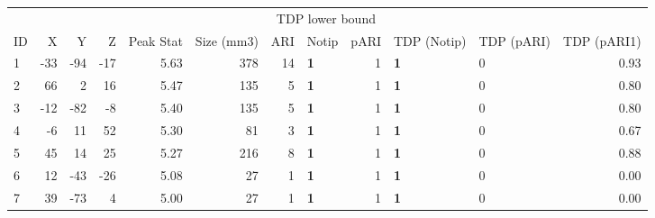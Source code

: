 
\begin{tabular}{lrrrrrrlrllr}
\toprule
\multicolumn{6}{c}{ } & \multicolumn{3}{c}{TDP lower bound} \\
\cmidrule(l{3pt}r{3pt}){7-9}
ID & X & Y & Z & Peak Stat & Size (mm3) & ARI & Notip & pARI & TDP (Notip) & TDP (pARI) & TDP (pARI1)\\
\midrule
1 & -33 & -94 & -17 & 5.63 & 378 & 14 & \textbf{1} & 1 & \textbf{1} & 0 & 0.93\\
2 & 66 & 2 & 16 & 5.47 & 135 & 5 & \textbf{1} & 1 & \textbf{1} & 0 & 0.80\\
3 & -12 & -82 & -8 & 5.40 & 135 & 5 & \textbf{1} & 1 & \textbf{1} & 0 & 0.80\\
4 & -6 & 11 & 52 & 5.30 & 81 & 3 & \textbf{1} & 1 & \textbf{1} & 0 & 0.67\\
5 & 45 & 14 & 25 & 5.27 & 216 & 8 & \textbf{1} & 1 & \textbf{1} & 0 & 0.88\\
6 & 12 & -43 & -26 & 5.08 & 27 & 1 & \textbf{1} & 1 & \textbf{1} & 0 & 0.00\\
7 & 39 & -73 & 4 & 5.00 & 27 & 1 & \textbf{1} & 1 & \textbf{1} & 0 & 0.00\\
\bottomrule
\end{tabular}
